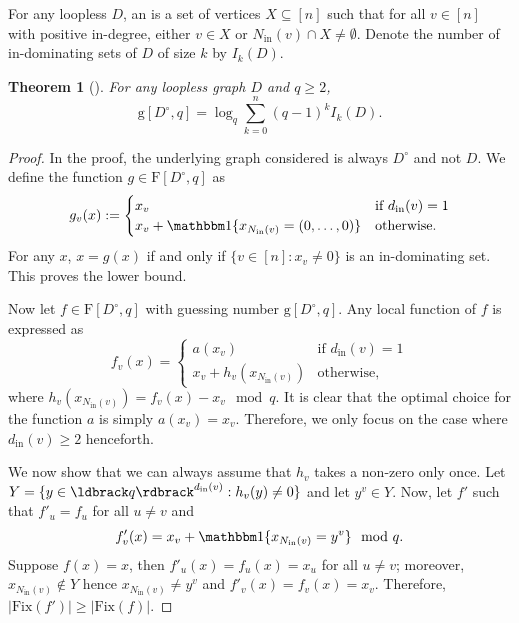 \documentclass[a4paper, 11pt]{book}
\numberwithin{equation}{section}
\theoremstyle{plain}
\newtheorem{theorem}	[equation]	{Theorem}
\newcommand{\loopfull}[1]{{#1^\circ}}
\newcommand{\neighbourhood}{N}
\newcommand{\degree}{d}
\newcommand{\inn}[1]{#1_\mathrm{in}}
\newcommand{\NIn}{\inn{\neighbourhood}}
\newcommand{\dIn}{\inn{\degree}}
\newcommand{\functions}{\mathrm{F}}
\newcommand{\Fix}{\mathrm{Fix}}
\newcommand{\guessing}{\mathrm{g}}
\renewcommand{\(}{\ldbrack}
\renewcommand{\)}{\rdbrack}
\newcommand{\BF}[1]{{\bf\boldmath{#1}\unboldmath}}
\newcommand{\one}[1]{{\mathbbm 1}\{ #1 \}}
\begin{document}
For any loopless $D$, an \BF{in-dominating set} is a set of vertices $X \subseteq [n]$ such that for all $v \in [n]$ with positive in-degree, either $v \in X$ or $\NIn(v) \cap X \ne \emptyset$. Denote the number of in-dominating sets of $D$ of size $k$ by $I_k(D)$.


\begin{theorem}[\cite{GRF16}] \label{th:g_strict_loops}
For any loopless graph $D$ and $q\geq 2$, 
\[
	\guessing[\loopfull{D}, q] = \log_q \sum_{k=0}^n (q-1)^k I_k(D).
\]
\end{theorem}

\begin{proof}
In the proof, the underlying graph considered is always $\loopfull{D}$ and not $D$. We define the function $g \in \functions[\loopfull{D},q]$ as
\[
	g_v(x) := \begin{cases}
	x_v & \mbox{if } \dIn(v) = 1\\
	x_v + \one{ x_{\NIn(v)} = (0,\dots,0) } & \mbox{otherwise}.
	\end{cases}
\]
For any $x$, $x = g(x)$ if and only if $\{v \in [n] : x_v \ne 0\}$ is an in-dominating set. This proves the lower bound.

Now let $f\in \functions[\loopfull{D},q]$ with guessing number $\guessing[\loopfull{D}, q]$. Any local function of $f$ is expressed as
\[
	f_v(x) = \begin{cases}
	a(x_v) & \mbox{if } \dIn(v) = 1\\
	x_v + h_v(x_{\NIn(v)}) & \mbox{otherwise},
	\end{cases}
\]
where $h_v(x_{\NIn(v)}) = f_v(x) - x_v \mod q$. It is clear that the optimal choice for the function $a$ is simply $a(x_v) = x_v$. Therefore, we only focus on the case where $\dIn(v) \ge 2$ henceforth.

We now show that we can always assume that $h_v$ takes a non-zero only once. Let $Y = \{y \in \(q\)^{\dIn(v)} : h_v(y) \ne 0\}$ and let $y^v \in Y$. Now, let $f'$ such that $f'_u = f_u$ for all $u \ne v$ and
\[
	f'_v(x) = x_v + \one{x_{\NIn(v)} = y^v}  \mod q.
\]
Suppose $f(x) = x$, then $f'_u(x) = f_u(x) = x_u$ for all $u \ne v$; moreover, $x_{\NIn(v)} \notin Y$ hence $x_{\NIn(v)} \ne y^v$ and $f'_v(x) = f_v(x) = x_v$. Therefore, $|\Fix(f')| \ge |\Fix(f)|$.


\end{proof}
\end{document}
